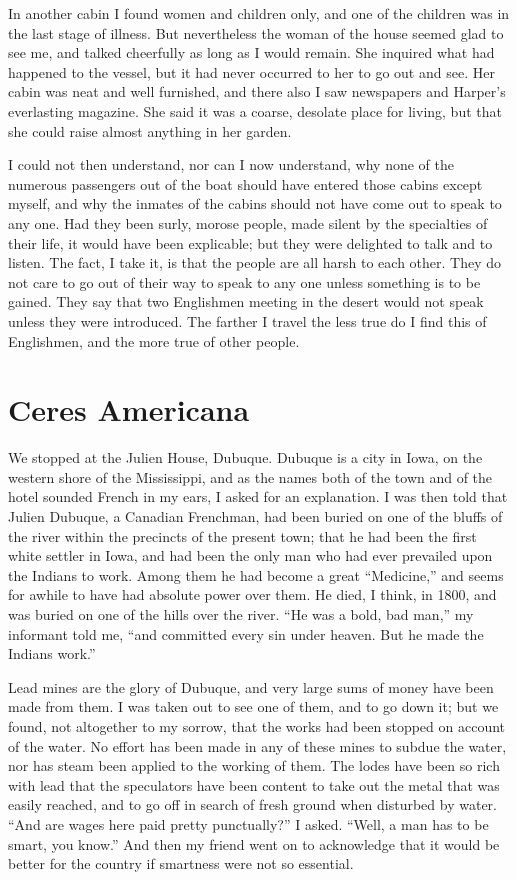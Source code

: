 In another cabin I found women and children only, and one of the
children was in the last stage of illness.  But nevertheless the
woman of the house seemed glad to see me, and talked cheerfully as
long as I would remain.  She inquired what had happened to the
vessel, but it had never occurred to her to go out and see.  Her
cabin was neat and well furnished, and there also I saw newspapers
and Harper's everlasting magazine.  She said it was a coarse,
desolate place for living, but that she could raise almost anything
in her garden.

I could not then understand, nor can I now understand, why none of
the numerous passengers out of the boat should have entered those
cabins except myself, and why the inmates of the cabins should not
have come out to speak to any one.  Had they been surly, morose
people, made silent by the specialties of their life, it would have
been explicable; but they were delighted to talk and to listen.
The fact, I take it, is that the people are all harsh to each
other.  They do not care to go out of their way to speak to any one
unless something is to be gained.  They say that two Englishmen
meeting in the desert would not speak unless they were introduced.
The farther I travel the less true do I find this of Englishmen,
and the more true of other people.



\chapter{Ceres Americana}


We stopped at the Julien House, Dubuque.  Dubuque is a city in
Iowa, on the western shore of the Mississippi, and as the names
both of the town and of the hotel sounded French in my ears, I
asked for an explanation.  I was then told that Julien Dubuque, a
Canadian Frenchman, had been buried on one of the bluffs of the
river within the precincts of the present town; that he had been
the first white settler in Iowa, and had been the only man who had
ever prevailed upon the Indians to work.  Among them he had become
a great ``Medicine,'' and seems for awhile to have had absolute power
over them.  He died, I think, in 1800, and was buried on one of the
hills over the river.  ``He was a bold, bad man,'' my informant told
me, ``and committed every sin under heaven.  But he made the Indians
work.''

Lead mines are the glory of Dubuque, and very large sums of money
have been made from them.  I was taken out to see one of them, and
to go down it; but we found, not altogether to my sorrow, that the
works had been stopped on account of the water.  No effort has been
made in any of these mines to subdue the water, nor has steam been
applied to the working of them.  The lodes have been so rich with
lead that the speculators have been content to take out the metal
that was easily reached, and to go off in search of fresh ground
when disturbed by water.  ``And are wages here paid pretty
punctually?'' I asked.  ``Well, a man has to be smart, you know.''
And then my friend went on to acknowledge that it would be better
for the country if smartness were not so essential.

